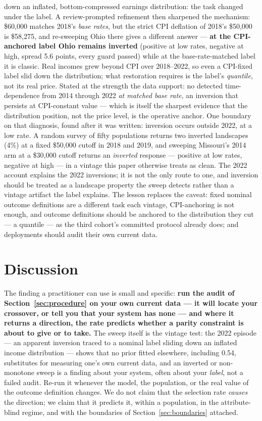 \documentclass[9pt,conference]{IEEEtran}
\begin{document}
down an inflated, bottom-compressed earnings distribution: the task changed under the
label. A review-prompted refinement then sharpened the mechanism: \$60{,}000 matches
2018's \emph{base rates}, but the strict CPI deflation of 2018's \$50{,}000 is
\$58{,}275, and re-sweeping Ohio there gives a different answer --- \textbf{at the
CPI-anchored label Ohio remains inverted} (positive at low rates, negative at high,
spread 5.6 points, every guard passed) while at the base-rate-matched label it is
classic. Real incomes grew beyond CPI over 2018--2022, so even a CPI-fixed label slid
down the distribution; what restoration requires is the label's \emph{quantile}, not
its real price. Stated at the strength the data support: no detected time-dependence
from 2014 through 2022 \emph{at matched base rate}, an inversion that persists at
CPI-constant value --- which is itself the sharpest evidence that the distribution
position, not the price level, is the operative anchor. One boundary on that diagnosis, found after it was written: inversion occurs outside 2022,
at a low rate. A random survey of fifty populations returns two inverted landscapes (4\%) at
a fixed \$50{,}000 cutoff in 2018 and 2019, and sweeping Missouri's 2014 arm at
a \$30{,}000 cutoff returns an \emph{inverted} response --- positive at low rates, negative
at high --- in a vintage this paper otherwise treats as clean. The 2022 account explains the
2022 inversions; it is not the only route to one, and inversion should be treated as a
landscape property the sweep detects rather than a vintage artifact the label explains.
The lesson replaces the caveat:
fixed nominal outcome definitions are a different task each vintage, CPI-anchoring is
not enough, and outcome definitions should be anchored to the distribution they cut ---
a quantile --- as the third cohort's committed protocol already does; and deployments
should audit their own current data.

\section{Discussion}
\label{sec:discussion}

The finding a practitioner can use is small and specific: \textbf{run the audit of
Section~\ref{sec:procedure} on your own current data --- it will locate your crossover, or
tell you that your system has none --- and where it returns a direction, the rate predicts
whether a parity constraint is about to give or to take.} The sweep itself is the vintage
test: the 2022 episode --- an apparent inversion traced to a nominal label sliding down an
inflated income distribution --- shows that no prior fitted elsewhere, including 0.54,
substitutes for measuring one's own current data, and an inverted or non-monotone sweep is
a finding about your system, often about your \emph{label}, not a failed audit. Re-run it
whenever the model, the population, or the real value of the outcome definition changes. We do not claim that the selection rate \emph{causes} the direction; we claim
that it predicts it, within a population, in the attribute-blind regime, and with the
boundaries of Section~\ref{sec:boundaries} attached.
\end{document}
